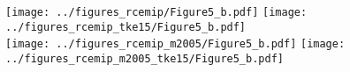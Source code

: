 \documentclass[class=minimal,border=0pt,varwidth]{standalone}
\begin{document}
\texttt{[image: ../figures\_rcemip/Figure5\_b.pdf]}
\texttt{[image: ../figures\_rcemip\_tke15/Figure5\_b.pdf]}\\
\texttt{[image: ../figures\_rcemip\_m2005/Figure5\_b.pdf]}
\texttt{[image: ../figures\_rcemip\_m2005\_tke15/Figure5\_b.pdf]}
\end{document}
